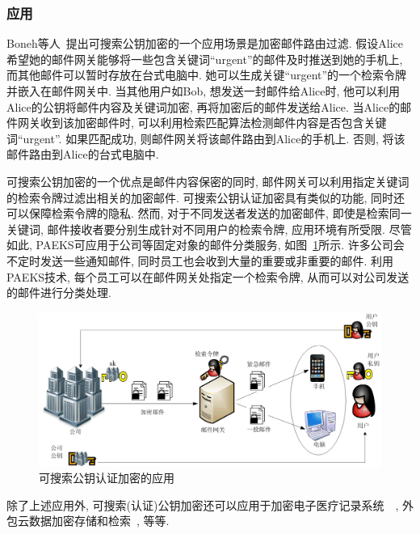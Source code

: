 \subsubsection{应用}
Boneh等人~\cite{BDOP2004}提出可搜索公钥加密的一个应用场景是加密邮件路由过滤. 假设Alice希望她的邮件网关能够将一些包含关键词``urgent''的邮件及时推送到她的手机上, 而其他邮件可以暂时存放在台式电脑中. 她可以生成关键``urgent''的一个检索令牌并嵌入在邮件网关中. 当其他用户如Bob, 想发送一封邮件给Alice时,  他可以利用Alice的公钥将邮件内容及关键词加密, 再将加密后的邮件发送给Alice. 当Alice的邮件网关收到该加密邮件时, 可以利用检索匹配算法检测邮件内容是否包含关键词``urgent''. 如果匹配成功, 则邮件网关将该邮件路由到Alice的手机上. 否则, 将该邮件路由到Alice的台式电脑中. 


可搜索公钥加密的一个优点是邮件内容保密的同时, 邮件网关可以利用指定关键词的检索令牌过滤出相关的加密邮件. 可搜索公钥认证加密具有类似的功能, 同时还可以保障检索令牌的隐私. 然而, 对于不同发送者发送的加密邮件, 即使是检索同一关键词, 邮件接收者要分别生成针对不同用户的检索令牌, 应用环境有所受限. 尽管如此, PAEKS可应用于公司等固定对象的邮件分类服务, 如图~\ref{figure:ch6-PAEKSApp}所示. 许多公司会不定时发送一些通知邮件, 同时员工也会收到大量的重要或非重要的邮件. 利用PAEKS技术, 每个员工可以在邮件网关处指定一个检索令牌, 从而可以对公司发送的邮件进行分类处理. 
\begin{figure}[htp!]
\centering
\includegraphics[scale=0.8]{./figure/ch6-PAEKSApp.png}
\caption{可搜索公钥认证加密的应用}\label{figure:ch6-PAEKSApp}
\end{figure}



除了上述应用外, 可搜索(认证)公钥加密还可以应用于加密电子医疗记录系统~~\cite{GY-JMS-2015,LL-CC-2019}, 外包云数据加密存储和检索~\cite{GYZHLQH-TDSC-2021}, 等等.
















